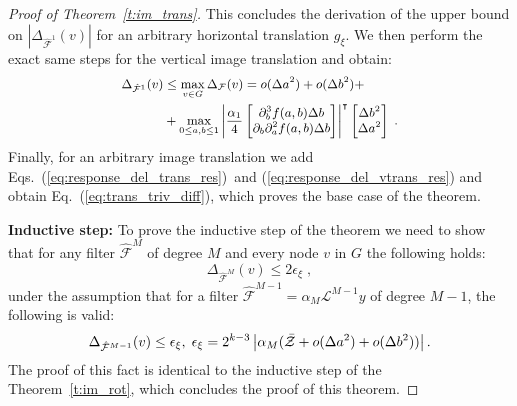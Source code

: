 \documentclass[10pt,journal,compsoc]{IEEEtran}
\newcommand{\hmF}{\hat{\mathcal{F}}}
\newcommand{\norm}[1]{\left|#1\right|}
\begin{document}
\begin{proof}[Proof of Theorem~\ref{t:im_trans}]
		This concludes the derivation of the upper bound on $\left|\Delta_{\hmF^1} (v)\right|$ for an arbitrary horizontal translation $g_\xi$. We then perform the exact same steps for the vertical image translation and obtain:
		\begin{equation}
		\small
		\begin{aligned}
		\Delta_{\hmF^1} (v) & \leq \max_{v \in G} \Delta_\mathcal{F} (v)  = o(\Delta a^2) + o(\Delta b^2) + \\
		& +
		\max_{0 \leq a,b \leq 1}
		\left| \frac{\alpha_1}{4}
		\begin{bmatrix}
		\partial^3_b f(a,b)\Delta b\\
		\partial_b\partial^2_a f(a,b) \Delta b\\
		\end{bmatrix}
		\right|^\intercal
		\begin{bmatrix}
		\Delta b^2 \\
		\Delta a^2 \\
		\end{bmatrix}\;.\\
		\end{aligned}
		\label{eq:response_del_vtrans_res}
		\end{equation}
		\noindent
		Finally, for an arbitrary image translation we add  Eqs.~(\ref{eq:response_del_trans_res})~and (\ref{eq:response_del_vtrans_res}) and obtain Eq.~(\ref{eq:trans_triv_diff}), which proves the base case of the theorem.

		\textbf{Inductive step:} %
		To prove the inductive step of the theorem we need to show that for any filter $\hmF^M$ of degree $M$ and every node $v$ in $G$ the following holds:
			\begin{equation}
			\Delta_{\hmF^M} (v) \leq 2\epsilon_\xi\;,
			\end{equation}
			\noindent
			under the assumption that for a filter $\hmF^{M-1} = \alpha_M \mathcal{L}^{M-1} y$ of degree $M-1$, the following is valid:
			\begin{equation}
			\small
			\Delta_{\hmF^{M-1}} (v) \leq \epsilon_\xi, \; \epsilon_\xi = 2^{k-3} \norm{\alpha_M (\bar{\mathcal{Z}} + o(\Delta a^2) + o(\Delta b^2))}.
			\end{equation}
			\noindent
			The proof of this fact is identical to the inductive step of the Theorem~\ref{t:im_rot}, which concludes the proof of this theorem.

	\end{proof}
\end{document}
